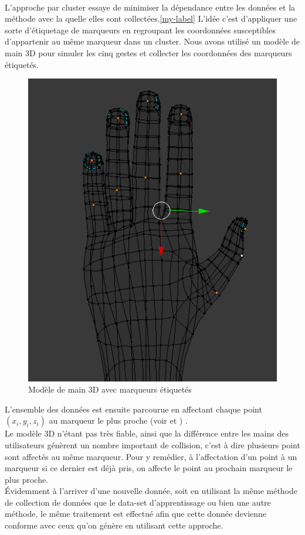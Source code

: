 \paragraph{}
L’approche par cluster essaye de minimiser la dépendance entre les données et la méthode avec la quelle elles sont collectées.\ref{my-label} L’idée c’est d’appliquer une sorte d’étiquetage de marqueurs en regroupant les coordonnées susceptibles d’appartenir au même marqueur dans un cluster. Nous avons utilisé un modèle de main 3D pour simuler les cinq gestes et collecter les coordonnées des marqueurs étiquetés.\\
\begin{center}
	\begin{figure}[H]
		\centering
		\includegraphics[scale=0.4]{images/3DModel.png}
		\caption{\small Modèle de main 3D avec marqueurs étiquetés}
	\end{figure}
\end{center}
L’ensemble des données est ensuite parcourue en affectant chaque point $(x_i,y_i,z_i)$ au marqueur le plus proche (voir \cite{knn} et \cite{knn2}) .\\
Le modèle 3D n’étant pas très fiable, ainsi que la différence entre les mains des utilisateurs génèrent un nombre important de collision, c’est à dire plusieurs point sont affectés au même marqueur. Pour y remédier, à l’affectation d’un point à un marqueur si ce dernier est déjà pris, on affecte le point au prochain marqueur le plus proche.\\
Évidemment à l’arriver d’une nouvelle donnée, soit en utilisant la même méthode de collection de données que le data-set d’apprentissage ou bien une autre méthode, le même traitement est effectué afin que cette donnée devienne conforme avec ceux qu’on génère en utilisant cette approche.